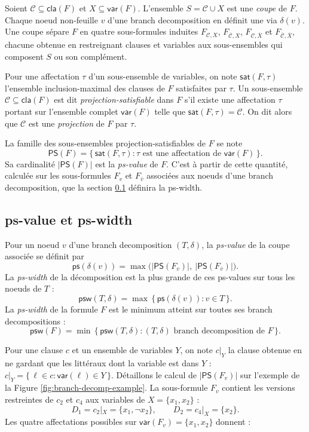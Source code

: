 \documentclass[11pt,a4paper]{report}
\theoremstyle{plain}
\theoremstyle{definition}
\begin{document}
Soient $\mathcal{C} \subseteq \mathsf{cla}(F)$ et
$X \subseteq \mathsf{var}(F)$. L'ensemble $S = \mathcal{C} \cup X$ est
une \emph{coupe} de $F$. Chaque noeud non-feuille $v$ d'une branch
decomposition en définit une via $\delta(v)$. Une coupe sépare $F$ en
quatre sous-formules induites $F_{\mathcal{C},X}$,
$F_{\overline{\mathcal{C}},X}$, $F_{\mathcal{C},\overline{X}}$ et
$F_{\overline{\mathcal{C}},\overline{X}}$, chacune obtenue en
restreignant clauses et variables aux sous-ensembles qui composent $S$
ou son complément.

Pour une affectation $\tau$ d'un sous-ensemble de variables, on note
$\mathsf{sat}(F, \tau)$ l'ensemble inclusion-maximal des clauses de $F$
satisfaites par $\tau$. Un sous-ensemble
$\mathcal{C} \subseteq \mathsf{cla}(F)$ est dit
\emph{projection-satisfiable} dans $F$ s'il existe une affectation
$\tau$ portant sur l'ensemble complet $\mathsf{var}(F)$ telle que
$\mathsf{sat}(F, \tau) = \mathcal{C}$. On dit alors que $\mathcal{C}$
est une \emph{projection} de $F$ par $\tau$.

La famille des sous-ensembles projection-satisfiables de $F$ se note
\[
  \mathsf{PS}(F) = \{\, \mathsf{sat}(F, \tau) : \tau \text{ est une affectation de } \mathsf{var}(F)\,\}.
\]
Sa cardinalité $|\mathsf{PS}(F)|$ est la \emph{ps-value} de $F$. C'est
à partir de cette quantité, calculée sur les sous-formules $F_v$ et
$F_{\overline{v}}$ associées aux noeuds d'une branch decomposition, que
la section \ref{ssec:theo-pswidth-def} définira la ps-width.

\subsection{ps-value et ps-width}
\label{ssec:theo-pswidth-def}

Pour un noeud $v$ d'une branch decomposition $(T, \delta)$, la
\emph{ps-value} de la coupe associée se définit par
\[
  \mathsf{ps}(\delta(v)) = \max\bigl(|\mathsf{PS}(F_v)|,\
  |\mathsf{PS}(F_{\overline{v}})|\bigr).
\]
La \emph{ps-width} de la décomposition est la plus grande de ces
ps-values sur tous les noeuds de $T$ :
\[
  \mathsf{psw}(T, \delta) = \max\,\bigl\{\,\mathsf{ps}(\delta(v)) :
  v \in T\,\bigr\}.
\]
La \emph{ps-width} de la formule $F$ est le minimum atteint sur
toutes ses branch decompositions :
\[
  \mathsf{psw}(F) = \min\,\bigl\{\,\mathsf{psw}(T, \delta) : (T, \delta)
  \text{ branch decomposition de } F\,\bigr\}.
\]

Pour une clause $c$ et un ensemble de variables $Y$, on note $c|_Y$
la clause obtenue en ne gardant que les littéraux dont la variable est
dans $Y$ : $c|_Y = \{\, \ell \in c : \mathsf{var}(\ell) \in Y\,\}$.
Détaillons le calcul de $|\mathsf{PS}(F_v)|$ sur l'exemple de la
Figure \ref{fig:branch-decomp-example}. La sous-formule $F_v$ contient
les versions restreintes de $c_2$ et $c_4$ aux variables de $X = \{x_1, x_2\}$ :
\[
  D_1 = c_2|_X = \{x_1, \neg x_2\},
  \qquad
  D_2 = c_4|_X = \{x_2\}.
\]
Les quatre affectations possibles sur $\mathsf{var}(F_v) = \{x_1, x_2\}$
donnent :
\end{document}
